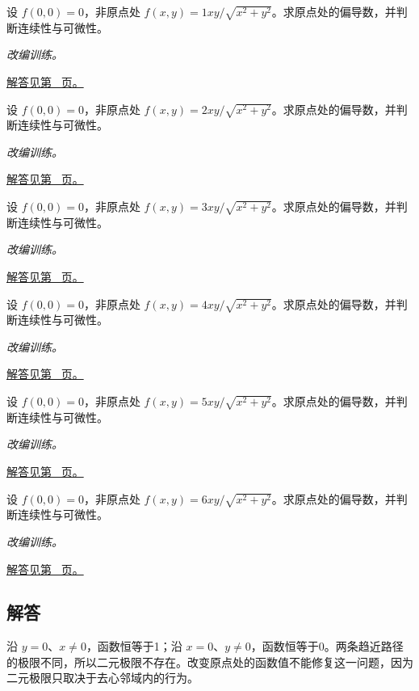 \documentclass[12pt,fontset=fandol]{ctexart}
\begin{document}
\begin{example}[偏导存在却不可微]\label{ex:c32q20}
设 $f(0,0)=0$，非原点处 $f(x,y)=1xy/\sqrt{x^2+y^2}$。求原点处的偏导数，并判断连续性与可微性。
\par\textit{改编训练。}\par\hyperref[ans:c32q20]{解答见第~\pageref{ans:c32q20} 页。}
\end{example}
\begin{example}[偏导存在却不可微]\label{ex:c32q21}
设 $f(0,0)=0$，非原点处 $f(x,y)=2xy/\sqrt{x^2+y^2}$。求原点处的偏导数，并判断连续性与可微性。
\par\textit{改编训练。}\par\hyperref[ans:c32q21]{解答见第~\pageref{ans:c32q21} 页。}
\end{example}
\begin{example}[偏导存在却不可微]\label{ex:c32q22}
设 $f(0,0)=0$，非原点处 $f(x,y)=3xy/\sqrt{x^2+y^2}$。求原点处的偏导数，并判断连续性与可微性。
\par\textit{改编训练。}\par\hyperref[ans:c32q22]{解答见第~\pageref{ans:c32q22} 页。}
\end{example}
\begin{example}[偏导存在却不可微]\label{ex:c32q23}
设 $f(0,0)=0$，非原点处 $f(x,y)=4xy/\sqrt{x^2+y^2}$。求原点处的偏导数，并判断连续性与可微性。
\par\textit{改编训练。}\par\hyperref[ans:c32q23]{解答见第~\pageref{ans:c32q23} 页。}
\end{example}
\begin{example}[偏导存在却不可微]\label{ex:c32q24}
设 $f(0,0)=0$，非原点处 $f(x,y)=5xy/\sqrt{x^2+y^2}$。求原点处的偏导数，并判断连续性与可微性。
\par\textit{改编训练。}\par\hyperref[ans:c32q24]{解答见第~\pageref{ans:c32q24} 页。}
\end{example}
\begin{example}[偏导存在却不可微]\label{ex:c32q25}
设 $f(0,0)=0$，非原点处 $f(x,y)=6xy/\sqrt{x^2+y^2}$。求原点处的偏导数，并判断连续性与可微性。
\par\textit{改编训练。}\par\hyperref[ans:c32q25]{解答见第~\pageref{ans:c32q25} 页。}
\end{example}
\subsection{解答}
\begin{solve}\label{ans:c32q1}
沿 $y=0$、$x\ne0$，函数恒等于1；沿 $x=0$、$y\ne0$，函数恒等于0。两条趋近路径的极限不同，所以二元极限不存在。改变原点处的函数值不能修复这一问题，因为二元极限只取决于去心邻域内的行为。
\end{solve}
\end{document}
